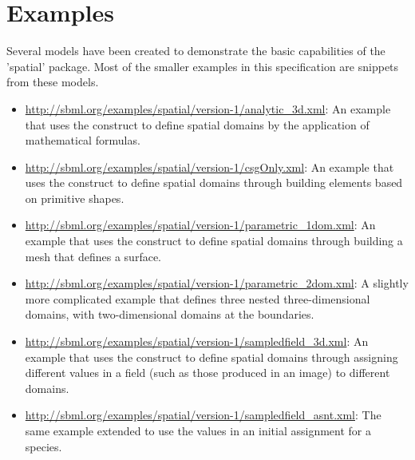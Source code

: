
\section{Examples}
\label{examples}

\begin{blockChanged}
Several models have been created to demonstrate the basic capabilities of the 'spatial' package.  Most of the smaller examples in this specification are snippets from these models.

\begin{itemize}
  
\item \url{http://sbml.org/examples/spatial/version-1/analytic_3d.xml}: An example that uses the \AnalyticGeometry construct to define spatial domains by the application of mathematical formulas.

\item \url{http://sbml.org/examples/spatial/version-1/csgOnly.xml}: An example that uses the \CSGeometry construct to define spatial domains through building elements based on primitive shapes.

\item \url{http://sbml.org/examples/spatial/version-1/parametric_1dom.xml}: An example that uses the \ParametricGeometry construct to define spatial domains through building a mesh that defines a surface.

\item \url{http://sbml.org/examples/spatial/version-1/parametric_2dom.xml}: A slightly more complicated \ParametricGeometry example that defines three nested three-dimensional domains, with two-dimensional domains at the boundaries.

\item \url{http://sbml.org/examples/spatial/version-1/sampledfield_3d.xml}: An example that uses the \SampledFieldGeometry construct to define spatial domains through assigning different values in a field (such as those produced in an image) to different domains.

\item \url{http://sbml.org/examples/spatial/version-1/sampledfield_asnt.xml}: The same \SampledFieldGeometry example extended to use the \SampledField values in an initial assignment for a species.

\end{itemize}
\end{blockChanged}
